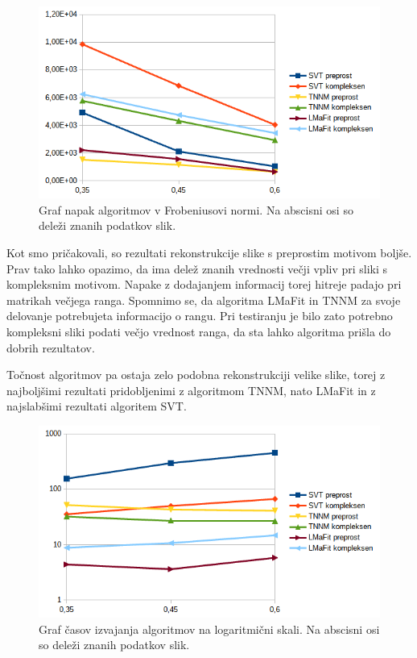 \begin{figure}[!ht]
    \centering
    \includegraphics[width=\linewidth]{Poglavja/Slike/kompleksnost/kompleksna grayscale 300/kompleksnost.png}
    \caption{Graf napak algoritmov v Frobeniusovi normi. Na abscisni osi so deleži znanih podatkov slik.}
\end{figure}

Kot smo pričakovali, so rezultati rekonstrukcije slike s preprostim motivom boljše. Prav tako lahko opazimo, da ima delež znanih vrednosti večji vpliv pri sliki s kompleksnim motivom. Napake z dodajanjem informacij torej hitreje padajo pri matrikah večjega ranga. Spomnimo se, da algoritma LMaFit in TNNM za svoje delovanje potrebujeta informacijo o rangu. Pri testiranju je bilo zato potrebno kompleksni sliki podati večjo vrednost ranga, da sta lahko algoritma prišla do dobrih rezultatov.

Točnost algoritmov pa ostaja zelo podobna rekonstrukciji velike slike, torej z najboljšimi rezultati pridobljenimi z algoritmom TNNM, nato LMaFit in z najslabšimi rezultati algoritem SVT.


\begin{figure}[!ht]
    \centering
    \includegraphics[width=\linewidth]{Poglavja/Slike/kompleksnost/kompleksna grayscale 300/cas.png}
    \caption{Graf časov izvajanja algoritmov na logaritmični skali. Na abscisni osi so deleži znanih podatkov slik.}
    \label{1707-1504}
\end{figure}
\FloatBarrier



